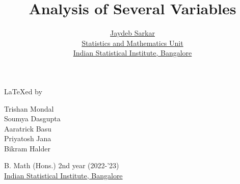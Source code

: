 \documentclass{report}
\title{\Huge Analysis of Several Variables}
\author{{\LARGE \href{https://www.isibang.ac.in/~jay/}{Jaydeb Sarkar}} \\[0.5cm]
  \href{https://www.isibang.ac.in/~statmath}{Statistics and Mathematics Unit} \\
  \href{https://www.isibang.ac.in}{Indian Statistical Institute, Bangalore}}
\date{}
\begin{document}



\maketitle

{\vspace*{\fill}\centering
  {\LARGE \LaTeX ed by}
  \vspace{0.5cm}
  \begin{center}
    \large
    Trishan Mondal \\
    Soumya Dasgupta \\
    Aaratrick Basu \\
    Priyatosh Jana \\
    Bikram Halder
  \end{center}
  \vspace{0.5cm}
  \begin{center}
    B. Math (Hons.) 2nd year (2022-'23) \\
    \href{https://www.isibang.ac.in}{Indian Statistical Institute, Bangalore}
  \end{center}
  \vspace*{\fill}}

\tableofcontents





% 
















\end{document}
